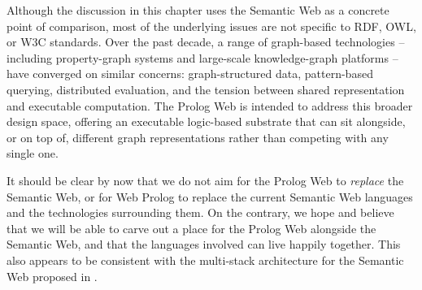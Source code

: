 %


\noindent Although the discussion in this chapter uses the Semantic Web as a concrete point of comparison, most of the underlying issues are not specific to RDF, OWL, or W3C standards. Over the past decade, a range of graph-based technologies -- including property-graph systems and large-scale knowledge-graph platforms -- have converged on similar concerns: graph-structured data, pattern-based querying, distributed evaluation, and the tension between shared representation and executable computation. The Prolog Web is intended to address this broader design space, offering an executable logic-based substrate that can sit alongside, or on top of, different graph representations rather than competing with any single one. 

It should be clear by now that we do not aim for the Prolog Web to \textit{replace} the Semantic Web, or for Web Prolog to replace the current Semantic Web languages and the technologies surrounding them. On the contrary, we hope and believe that we will be able to carve out a place for the Prolog Web alongside the Semantic Web, and that the languages involved can live happily together. This also appears to be consistent with the multi-stack architecture for the Semantic Web proposed in \citep{Kifer2005,Horrocks2005}.

